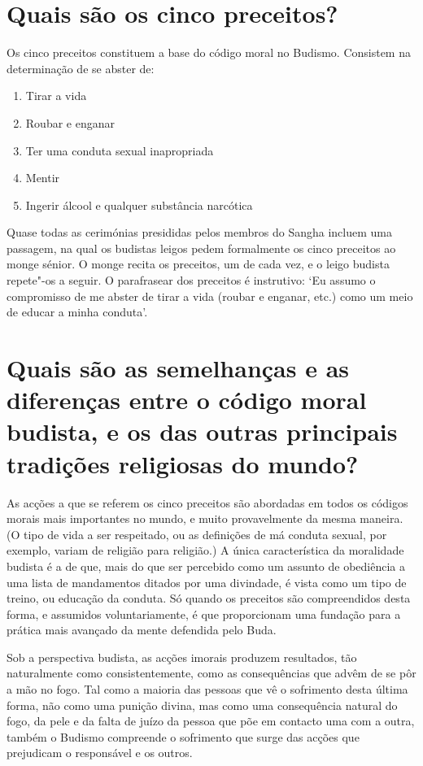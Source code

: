 \section{Quais são os cinco preceitos?}

Os cinco preceitos constituem a base do código moral no Budismo.
Consistem na determinação de se abster de:

\begin{enumerate}
\item Tirar a vida
\item Roubar e enganar
\item Ter uma conduta sexual inapropriada
\item Mentir
\item Ingerir álcool e qualquer substância narcótica
\end{enumerate}

Quase todas as cerimónias presididas pelos membros do Sangha incluem uma
passagem, na qual os budistas leigos pedem formalmente os cinco
preceitos ao monge sénior. O monge recita os preceitos, um de cada vez,
e o leigo budista repete"-os a seguir. O parafrasear dos preceitos é
instrutivo: `Eu assumo o compromisso de me abster de tirar a vida
(roubar e enganar, etc.) como um meio de educar a minha conduta'.

\section{Quais são as semelhanças e as diferenças entre o código moral budista,
  e os das outras principais tradições religiosas do mundo?}

As acções a que se referem os cinco preceitos são abordadas em todos os
códigos morais mais importantes no mundo, e muito provavelmente da mesma
maneira. (O tipo de vida a ser respeitado, ou as definições de má
conduta sexual, por exemplo, variam de religião para religião.) A única
característica da moralidade budista é a de que, mais do que ser
percebido como um assunto de obediência a uma lista de mandamentos
ditados por uma divindade, é vista como um tipo de treino, ou educação
da conduta. Só quando os preceitos são compreendidos desta forma, e
assumidos voluntariamente, é que proporcionam uma fundação para a
prática mais avançado da mente defendida pelo Buda.

Sob a perspectiva budista, as acções imorais produzem resultados, tão
naturalmente como consistentemente, como as consequências que advêm de
se pôr a mão no fogo. Tal como a maioria das pessoas que vê o sofrimento
desta última forma, não como uma punição divina, mas como uma
consequência natural do fogo, da pele e da falta de juízo da pessoa que
põe em contacto uma com a outra, também o Budismo compreende o
sofrimento que surge das acções que prejudicam o responsável e os
outros.

